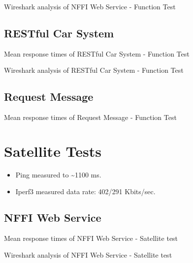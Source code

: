 \begin{appendices}
\begin{table}[H]

\caption{Wireshark analysis of NFFI Web Service - Function Test}
\end{table}

\subsection{RESTful Car System}

\begin{table}[H]

\caption{Mean response times of RESTful Car System - Function Test}
\end{table}

\begin{table}[H]

\caption{Wireshark analysis of RESTful Car System - Function Test}
\end{table}


\subsection{Request Message}

\begin{table}[H]

\caption{Mean response times of Request Message - Function Test}
\end{table}


\section{Satellite Tests}

\begin{itemize}
	\item Ping measured to \textasciitilde 1100 ms.
	\item Iperf3 measured data rate: 402/291 Kbits/sec.
\end{itemize}

\subsection{NFFI Web Service}

\begin{table}[H]

\caption{Mean response times of NFFI Web Service - Satellite test}
\end{table}

\begin{table}[H]

\caption{Wireshark analysis of NFFI Web Service - Satellite test}
\end{table}


\end{appendices}
